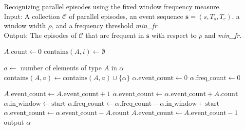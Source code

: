 \begin{algorithm}

\caption{Recognizing parallel episodes using the fixed window frequency measure. \\
Input: A collection $ \mathcal{C} $ of parallel episodes, an event sequence $ \boldsymbol{s} = (s, T_s, T_e) $, a window width $ \rho $, and a frequency threshold \textit{min\_fr}. \\
Output: The episodes of $ \mathcal{C} $ that are frequent in $ \boldsymbol{s} $ with respect to $ \rho $ and \textit{min\_fr}.
}

\begin{algorithmic}[1]

        \State $ A \text{.count} \gets 0 $
         $ \text{contains}(A, i) \gets \emptyset $ \EndFor
    \EndFor
\EndFor

        \State $ a \gets $ number of elements of type $ A $ in $ \alpha $
        \State $ \text{contains}(A, a) \gets \text{contains}(A, a) \cup \{ \alpha \} $
    \EndFor
    \State $ \alpha \text{.event\_count} \gets 0 $
    \State $ \alpha \text{.freq\_count} \gets 0 $
\EndFor

     \label{alglin:rec-par-fwi:new-events}
        \State $ A \text{.event\_count} \gets A \text{.event\_count} + 1 $
            \State $ \alpha \text{.event\_count} \gets \alpha \text{.event\_count} + A \text{.count} $
             $ \alpha \text{.in\_window} \gets \text{start} $
            \EndIf
        \EndFor
    \EndFor
     \label{alglin:rec-par-fwi:old-events}
                \State $ \alpha \text{.freq\_count} \gets \alpha \text{.freq\_count} - \alpha \text{.in\_window} + \text{start} $
            \EndIf
            \State $ \alpha \text{.event\_count} \gets \alpha \text{.event\_count} - A \text{.count} $
        \EndFor
        \State $ A \text{.event\_count} \gets A \text{.event\_count} - 1 $
    \EndFor
\EndFor
{}
     output $ \alpha $
    \EndIf
\EndFor

\end{algorithmic}

\label{alg:rec-par-fwi}
\end{algorithm}

